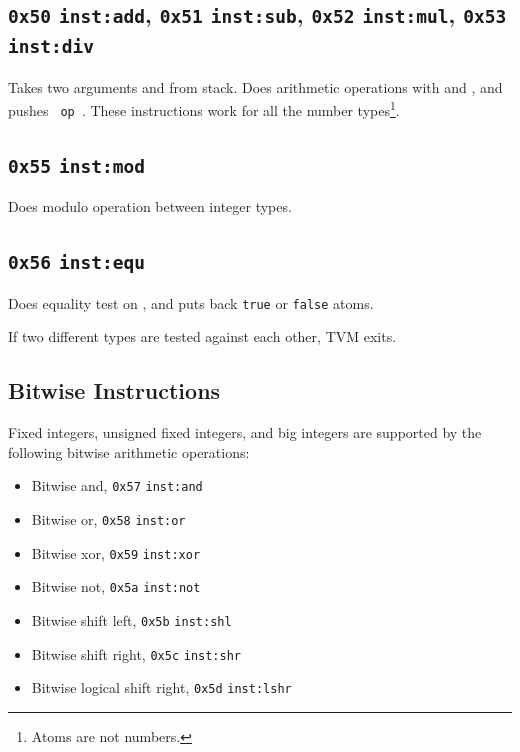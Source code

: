 \documentclass{report}
\newcommand{\inst}[1] {\texttt{inst:#1}}
\begin{document}
\subsection{\texttt{0x50} \inst{add}, \texttt{0x51} \inst{sub}, \texttt{0x52} \inst{mul}, \texttt{0x53} \inst{div}}

Takes two arguments  and  from stack. Does arithmetic operations with  and , and pushes \texttt{ op }. These instructions work for all the number types\footnote{Atoms are not numbers.}.

\subsection{\texttt{0x55} \inst{mod}  }

Does modulo operation between integer types.

\subsection{\texttt{0x56} \inst{equ}  }

Does equality test on  , and puts back \texttt{true} or \texttt{false} atoms.

\begin{mdframed}[style=hint]
  If two different types are tested against each other, TVM exits.
\end{mdframed}

\subsection{Bitwise Instructions}

Fixed integers, unsigned fixed integers, and big integers are supported by the following bitwise arithmetic operations:
\begin{itemize}
\item Bitwise and, \texttt{0x57} \inst{and}  
\item Bitwise or, \texttt{0x58} \inst{or}  
\item Bitwise xor, \texttt{0x59} \inst{xor}  
\item Bitwise not, \texttt{0x5a} \inst{not} 
\item Bitwise shift left, \texttt{0x5b} \inst{shl}  
\item Bitwise shift right, \texttt{0x5c} \inst{shr}  
\item Bitwise logical shift right, \texttt{0x5d} \inst{lshr}  
\end{itemize}
\end{document}

